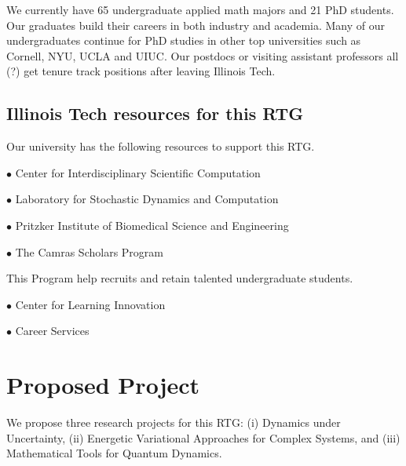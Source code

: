 \documentclass[11pt]{article}
\begin{document}


We currently have 65 undergraduate applied math majors and  21 PhD students. Our graduates build their careers in  both industry   and academia. Many of our undergraduates continue for PhD studies in other top universities such as Cornell, NYU, UCLA and UIUC. Our postdocs or visiting assistant professors all (?) get tenure track positions after leaving Illinois Tech.  





  


\subsection*{Illinois Tech resources  for this RTG}
Our university has the following resources to support this RTG.

 $\bullet$ Center for Interdisciplinary Scientific Computation
 
 $\bullet$ Laboratory for Stochastic Dynamics and Computation
 
 $\bullet$ Pritzker Institute of Biomedical Science and Engineering
 
  $\bullet$  The Camras Scholars Program
  
  This Program help recruits and retain talented undergraduate students. 
  
  $\bullet$  Center for Learning Innovation 
 
 
 $\bullet$   Career Services
 
 
 
 




\section{Proposed Project  }
    


We propose three research projects for this RTG: (i) Dynamics  under Uncertainty, (ii)  Energetic Variational Approaches for Complex Systems,  and (iii) Mathematical Tools for Quantum Dynamics.
 
\end{document}

